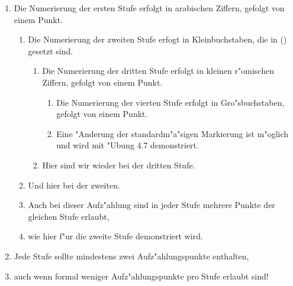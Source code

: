 \documentclass{article}
\begin{document}
\begin{enumerate}
\item Die Numerierung der ersten Stufe erfolgt in arabischen Ziffern,
      gefolgt von einem Punkt.
\begin{enumerate}
\item Die Numerierung der zweiten Stufe erfogt in Kleinbuchstaben,
      die in () gesetzt sind.
\begin{enumerate}
\item Die Numerierung der dritten Stufe erfolgt in kleinen r"omischen
      Ziffern, gefolgt von einem Punkt.
\begin{enumerate}
\item Die Numerierung der vierten Stufe erfolgt in Gro"sbuchstaben, gefolgt
      von einem Punkt.
\item Eine "Anderung der standardm"a"sigen Markierung ist m"oglich und wird
      mit "Ubung 4.7 demonstriert.
\end{enumerate}
\item Hier sind wir wieder bei der dritten Stufe.
\end{enumerate}
\item Und hier bei der zweiten.
\item Auch bei dieser Aufz"ahlung sind in jeder Stufe mehrere Punkte
      der gleichen Stufe erlaubt,
\item wie hier f"ur die zweite Stufe demonstriert wird.
\end{enumerate}
\item Jede Stufe sollte mindestens zwei Aufz"ahlungspunkte enthalten,
\item auch wenn formal weniger Aufz"ahlungspunkte pro Stufe erlaubt sind!
\end{enumerate}
\end{document}
